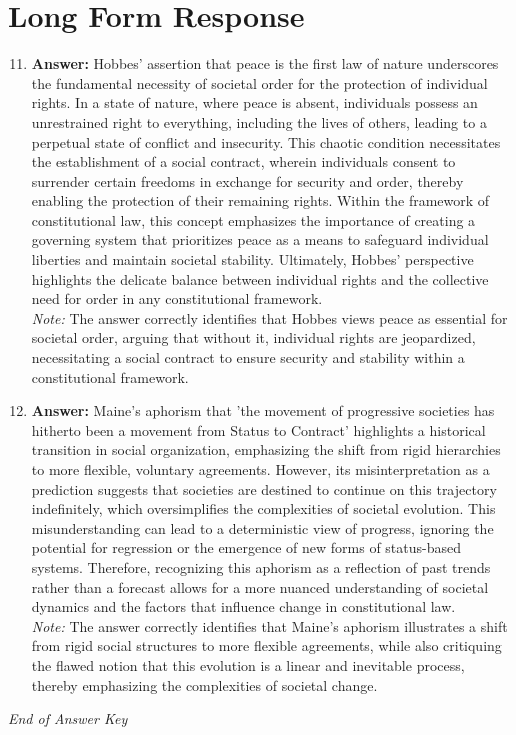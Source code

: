 \documentclass[12pt]{article}
\begin{document}
\section*{Long Form Response}
\begin{enumerate}[label=\arabic*.]
\setcounter{enumi}{10}
\item \textbf{Answer:} Hobbes' assertion that peace is the first law of nature underscores the fundamental necessity of societal order for the protection of individual rights. In a state of nature, where peace is absent, individuals possess an unrestrained right to everything, including the lives of others, leading to a perpetual state of conflict and insecurity. This chaotic condition necessitates the establishment of a social contract, wherein individuals consent to surrender certain freedoms in exchange for security and order, thereby enabling the protection of their remaining rights. Within the framework of constitutional law, this concept emphasizes the importance of creating a governing system that prioritizes peace as a means to safeguard individual liberties and maintain societal stability. Ultimately, Hobbes' perspective highlights the delicate balance between individual rights and the collective need for order in any constitutional framework.
\\ \textit{Note:} The answer correctly identifies that Hobbes views peace as essential for societal order, arguing that without it, individual rights are jeopardized, necessitating a social contract to ensure security and stability within a constitutional framework.
\item \textbf{Answer:} Maine's aphorism that 'the movement of progressive societies has hitherto been a movement from Status to Contract' highlights a historical transition in social organization, emphasizing the shift from rigid hierarchies to more flexible, voluntary agreements. However, its misinterpretation as a prediction suggests that societies are destined to continue on this trajectory indefinitely, which oversimplifies the complexities of societal evolution. This misunderstanding can lead to a deterministic view of progress, ignoring the potential for regression or the emergence of new forms of status-based systems. Therefore, recognizing this aphorism as a reflection of past trends rather than a forecast allows for a more nuanced understanding of societal dynamics and the factors that influence change in constitutional law.
\\ \textit{Note:} The answer correctly identifies that Maine's aphorism illustrates a shift from rigid social structures to more flexible agreements, while also critiquing the flawed notion that this evolution is a linear and inevitable process, thereby emphasizing the complexities of societal change.
\end{enumerate}

\vfill
\noindent\textit{End of Answer Key}
\end{document}
